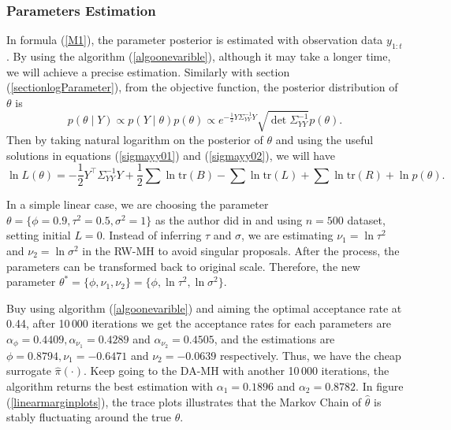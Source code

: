 \subsubsection*{Parameters Estimation}

In formula (\ref{M1}), the parameter posterior is estimated with observation data $y_{1:t}$. By using the algorithm (\ref{algoonevarible}), although it may take a longer time, we will achieve a precise estimation. Similarly with section (\ref{sectionlogParameter}), from the objective function, the posterior distribution of $\theta$ is 
\begin{equation*}
p(\theta \mid Y) \propto p(Y\mid\theta)p(\theta) \propto e^{-\frac{1}{2} Y \Sigma_{YY}^{-1} Y } \sqrt{\det \Sigma_{YY}^{-1}} p(\theta).
\end{equation*}
Then by taking natural logarithm on the posterior of $\theta$ and using the useful solutions in equations (\ref{sigmayy01}) and (\ref{sigmayy02}), we will have
\begin{equation}\label{linearlogL}
\ln L(\theta) = -\frac{1}{2}Y^\top\Sigma_{YY}^{-1}Y+\frac{1}{2}\sum\ln\mbox{tr}(B)-\sum\ln\mbox{tr}(L)+\sum\ln\mbox{tr}(R) + \ln p(\theta).
\end{equation}

In a simple linear case, we are choosing the parameter $\theta = \{\phi=0.9,\tau^2=0.5,\sigma^2=1\}$ as the author did in \cite{lopes2011particle} and using $n=500$ dataset, setting initial $L=0$. Instead of inferring $\tau$ and $\sigma$, we are estimating $\nu_1 = \ln \tau^2$ and $\nu_2 = \ln \sigma^2$ in the RW-MH to avoid singular proposals. After the process, the parameters can be transformed back to original scale. Therefore, the new parameter  $\theta^* =  \{\phi,\nu_1,\nu_2\} = \{\phi,\ln\tau^2,\ln\sigma^2\}$. 

Buy using algorithm (\ref{algoonevarible}) and aiming the optimal acceptance rate at 0.44, after 10\,000 iterations we get the acceptance rates for each parameters are $\alpha_\phi = 0.4409, \alpha_{\nu_1}= 0.4289$ and $\alpha_{\nu_2}= 0.4505$, and the estimations are $\phi =0.8794, \nu_1= -0.6471$ and $\nu_2= -0.0639$ respectively. Thus, we have the cheap surrogate $\hat{\pi}(\cdot)$. Keep going to the DA-MH with another 10\,000 iterations, the algorithm returns the best estimation with $\alpha_1=0.1896$ and $\alpha_2 = 0.8782$. In figure (\ref{linearmarginplots}), the trace plots illustrates that the Markov Chain of $\hat{\theta}$ is stably fluctuating around the true $\theta$. 

